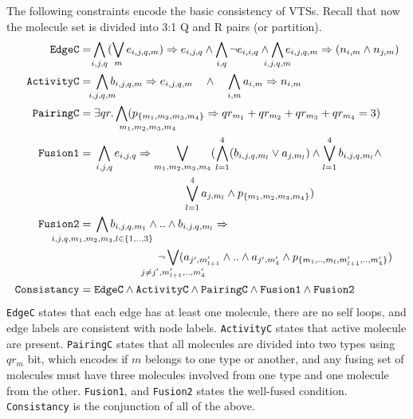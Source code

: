 The following constraints encode the basic consistency of VTSs. 
%
Recall that now the molecule set is divided into 3:1 Q and R pairs (or partition).
\begin{align*}
\texttt{EdgeC} =\;&\hspace{-1ex}\bigwedge\limits_{i,j,q} (\bigvee_m e_{i,j,q,m} )\limplies e_{i,j,q}
\land
\bigwedge\limits_{i,q} \neg e_{i,i,q}
\land
\bigwedge\limits_{\mathclap{i,j,q,m}} e_{i,j,q,m} \limplies (n_{i,m} \land n_{j,m} )
\\
\texttt{ActivityC} =\;&
\bigwedge\limits_{\mathclap{i,j,q,m}} b_{i,j,q,m} \limplies e_{i,j,q,m} \quad\land\quad
\bigwedge\limits_{i,m} a_{i,m} \limplies n_{i,m}
\\
\texttt{PairingC} =\;&
\exists qr. \Land\limits_{\mathrlap{m_1,m_2,m_3,m_4}\;\;}
(p_{\{m_1,m_2,m_3,m_4\}} \limplies qr_{m_1} + qr_{m_2} + qr_{m_3} + qr_{m_4} = 3) 
\\
\texttt{Fusion1} =\;&
\bigwedge\limits_{i,j,q} e_{i,j,q} \limplies
\bigvee_{{m_1,m_2,m_3,m_4}} (\Land_{l=1}^4 ( b_{i,j,q,m_l} \lor a_{j,m_l} ) \land 
\Lor\limits_{l=1}^4 b_{i,j,q,m_l} \land\\
& \qquad \qquad \qquad \qquad \Lor\limits_{l=1}^4 a_{j,m_l}\land p_{\{m_1,m_2,m_3,m_4\}})
\\
\texttt{Fusion2} =\;&
\bigwedge\limits_{\mathclap{i,j,q,m_1,m_2,m_3, l \in \{1,..,3\}}} b_{i,j,q,m_1} \land ..\land b_{i,j,q,m_l} \limplies \\
& \hspace{2cm} \neg 
\bigvee_{\mathclap{j \neq j^{\prime}, m_{l+1}^{\prime},..,m_{4}^{\prime}}} ( a_{j^{\prime},m_{l+1}^{\prime}} \land .. \land a_{j^{\prime},m_4^{\prime}} \land p_{\{m_1,..,m_l,m^{\prime}_{l+1},..,m^{\prime}_4\}})
\\
\texttt{Consistancy} =\;& \texttt{EdgeC} \land
\texttt{ActivityC} \land \texttt{PairingC} \land
\texttt{Fusion1} \land \texttt{Fusion2} 
\end{align*}
\texttt{EdgeC} states that each edge has at least one molecule,
there are no self loops, and edge labels are consistent with node labels.   
\texttt{ActivityC} states that active molecule are present.
\texttt{PairingC} states that all molecules are divided into two types
using $qr_m$ bit, which encodes if $m$ belongs to one type or another,
and any fusing set of molecules must have three molecules involved
from one type and one molecule from the other.
\texttt{Fusion1}, and \texttt{Fusion2} states the well-fused condition.
\texttt{Consistancy} is the conjunction of all of the above.

